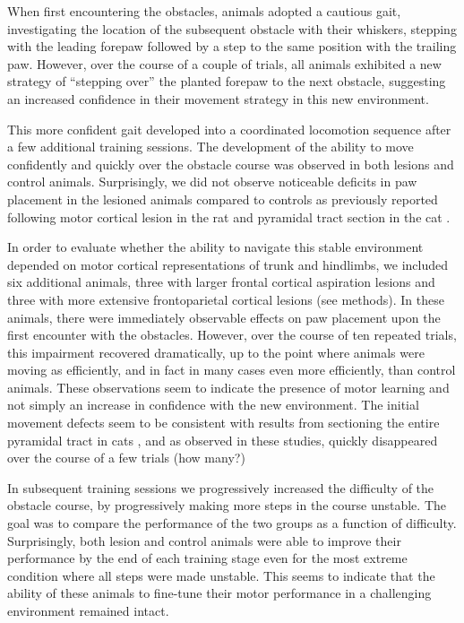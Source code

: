 When first encountering the obstacles, animals adopted a cautious gait, investigating the location of the subsequent obstacle with their whiskers, stepping with the leading forepaw followed by a step to the same position with the trailing paw. However, over the course of a couple of trials, all animals exhibited a new strategy of ``stepping over'' the planted forepaw to the next obstacle, suggesting an increased confidence in their movement strategy in this new environment.

This more confident gait developed into a coordinated locomotion sequence after a few additional training sessions. The development of the ability to move confidently and quickly over the obstacle course was observed in both lesions and control animals. Surprisingly, we did not observe noticeable deficits in paw placement in the lesioned animals compared to controls as previously reported following motor cortical lesion in the rat \cite{Metz2002} and pyramidal tract section in the cat \cite{Liddell1944}.

In order to evaluate whether the ability to navigate this stable environment depended on motor cortical representations of trunk and hindlimbs, we included six additional animals, three with larger frontal cortical aspiration lesions and three with more extensive frontoparietal cortical lesions (see methods). In these animals, there were immediately observable effects on paw placement upon the first encounter with the obstacles. However, over the course of ten repeated trials, this impairment recovered dramatically, up to the point where animals were moving as efficiently, and in fact in many cases even more efficiently, than control animals. These observations seem to indicate the presence of motor learning and not simply an increase in confidence with the new environment. The initial movement defects seem to be consistent with results from sectioning the entire pyramidal tract in cats \cite{Liddell1944}, and as observed in these studies, quickly disappeared over the course of a few trials (how many?)

In subsequent training sessions we progressively increased the difficulty of the obstacle course, by progressively making more steps in the course unstable. The goal was to compare the performance of the two groups as a function of difficulty. Surprisingly, both lesion and control animals were able to improve their performance by the end of each training stage even for the most extreme condition where all steps were made unstable. This seems to indicate that the ability of these animals to fine-tune their motor performance in a challenging environment remained intact.

